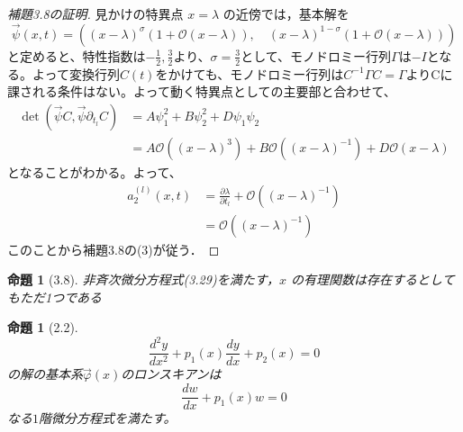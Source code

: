 \documentclass[paper=a4, fontsize=11pt]{jlreq} %
\newenvironment{story}{%
  \begin{mdframed}[
    backgroundcolor=red!5, %
    linewidth=0pt,         %
    innertopmargin=10pt,   %
    innerbottommargin=10pt,
    innerrightmargin=10pt, %
    innerleftmargin=10pt
  ]%
}{%
  \end{mdframed}%
}
\theoremstyle{break}
\newtheorem{proposition}[theorem]{命題}
\theoremstyle{qa}
\begin{document}
\begin{story}
\begin{proof}[補題3.8の証明]
見かけの特異点 $x=\lambda$ の近傍では，基本解を
\begin{equation*}
    \vec{\psi}(x,t) = \left( (x-\lambda)^\sigma(1+\mathcal{O}(x-\lambda)), \quad (x-\lambda)^{1-\sigma}(1+\mathcal{O}(x-\lambda)) \right)
\end{equation*}
と定めると、特性指数は$-\frac{1}{2},\frac{3}{2}$より、$\sigma=\frac{3}{2}$として、モノドロミー行列$\Gamma$は$-I$となる。よって変換行列$C(t)$をかけても、モノドロミー行列は$C^{-1}\Gamma C=\Gamma$よりCに課される条件はない。よって動く特異点としての主要部と合わせて、
\begin{align*}
\det(\vec{\psi}C, \vec{\psi}\partial_{t_l}C) &= A\psi_1^2 + B\psi_2^2 + D\psi_1\psi_2\\
&=A\mathcal{O}((x-\lambda)^{3}) + B\mathcal{O}((x-\lambda)^{-1}) + D\mathcal{O}(x-\lambda)
\end{align*}
となることがわかる。よって、
\begin{align*}
a_{2}^{(l)}(x,t)&=\frac{\partial \lambda}{\partial t_l}+\mathcal{O}((x-\lambda)^{-1})\\
&=\mathcal{O}((x-\lambda)^{-1})
\end{align*}
このことから補題3.8の(3)が従う．
\end{proof}
\end{story}
\begin{proposition}[3.8]
非斉次微分方程式(3.29)を満たす，$x$ の有理関数は存在するとしてもただ1つである
\end{proposition}

\begin{proposition}[2.2]
    \[
    \frac{d^{2}y}{dx^{2}}+p_{1}(x)\frac{dy}{dx}+p_{2}(x)=0
    \]
    の解の基本系$\vec{\varphi}(x)$のロンスキアンは
    \[
    \frac{dw}{dx}+p_{1}(x)w=0
    \]
    なる$1$階微分方程式を満たす。
\end{proposition}
\end{document}
